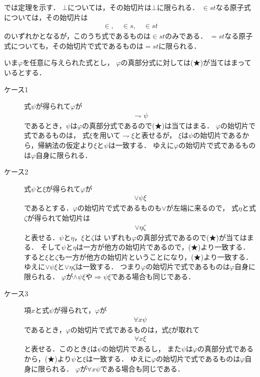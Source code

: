 	
	では定理を示す．
	$\bot$については，その始切片は$\bot$に限られる．
	$\in st$なる原子式については，その始切片は
	\begin{align}
		\in, \quad \in s, \quad \in st
	\end{align}
	のいずれかとなるが，このうち式であるものは$\in st$のみである．
	$=st$なる原子式についても，その始切片で式であるものは$=st$に限られる．
	
	いま$\varphi$を任意に与えられた式とし，
	$\varphi$の真部分式に対しては(★)が当てはまっているとする．
	\begin{description}
		\item[ケース1] 式$\psi$が得られて$\varphi$が
			\begin{align}
				\rightharpoondown \psi
			\end{align}
			であるとき，$\psi$は$\varphi$の真部分式であるので(★)は当てはまる．
			$\varphi$の始切片で式であるものは，
			式$\xi$を用いて$\rightharpoondown \xi$と表せるが，
			$\xi$は$\psi$の始切片であるから，帰納法の仮定より$\xi$と$\psi$は一致する．
			ゆえに$\varphi$の始切片で式であるものは$\varphi$自身に限られる．
			
		\item[ケース2] 式$\psi$と$\xi$が得られて$\varphi$が
			\begin{align}
				\vee \psi \xi
			\end{align}
			であるとする．$\varphi$の始切片で式であるものも$\vee$が左端に来るので，
			式$\eta$と式$\zeta$が得られて始切片は
			\begin{align}
				\vee \eta \zeta
			\end{align}
			と表せる．$\psi$と$\eta$，$\xi$と$\zeta$は
			いずれも$\varphi$の真部分式であるので(★)が当てはまる．
			そして$\psi$と$\eta$は一方が他方の始切片であるので，(★)より一致する．
			すると$\xi$と$\zeta$も一方が他方の始切片ということになり，(★)より一致する．
			ゆえに$\vee \psi \xi$と$\vee \eta \zeta$は一致する．
			つまり$\varphi$の始切片で式であるものは$\varphi$自身に限られる．
			$\varphi$が$\wedge \psi \xi$や$\Longrightarrow \psi \xi$である場合も同じである．
			
		\item[ケース3] 項$x$と式$\psi$が得られて，$\varphi$が
			\begin{align}
				\forall x \psi
			\end{align}
			であるとき，$\varphi$の始切片で式であるものは，式$\xi$が取れて
			\begin{align}
				\forall x \xi
			\end{align}
			と表せる．このとき$\xi$は$\psi$の始切片であるし，
			また$\psi$は$\varphi$の真部分式であるから，(★)より$\psi$と$\xi$は一致する．
			ゆえに$\varphi$の始切片で式であるものは$\varphi$自身に限られる．
			$\varphi$が$\forall x \psi$である場合も同じである．
			\QED
	\end{description}

